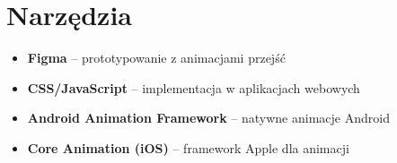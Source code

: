\section{Narzędzia}
\begin{itemize}[itemsep=0pt]
    \item \textbf{Figma} -- prototypowanie z animacjami przejść
    \item \textbf{CSS/JavaScript} -- implementacja w aplikacjach webowych
    \item \textbf{Android Animation Framework} -- natywne animacje Android
    \item \textbf{Core Animation (iOS)} -- framework Apple dla animacji
\end{itemize}

